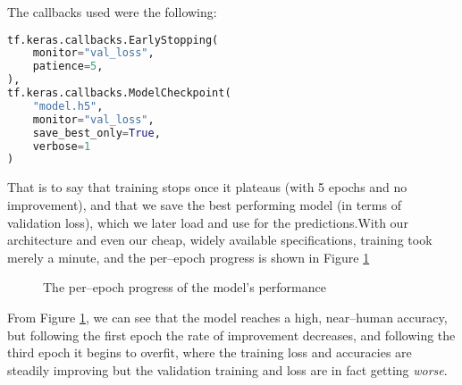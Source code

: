 \documentclass[conference]{IEEEtran}
\begin{document}
The callbacks used were the following:
\begin{lstlisting}[language=Python]
tf.keras.callbacks.EarlyStopping( 
    monitor="val_loss",
    patience=5,
),
tf.keras.callbacks.ModelCheckpoint( 
    "model.h5",
    monitor="val_loss",
    save_best_only=True,
    verbose=1
)
\end{lstlisting}
That is to say that training stops once it plateaus (with 5 epochs and no improvement), and that we save the best performing model (in terms of validation loss), which we later load and use for the predictions.\@ With our architecture and even our cheap, widely available specifications, training took merely a minute, and the per--epoch progress is shown in Figure \ref{fig:perepoch}
\begin{figure}[!h]
    \centering
    \scriptsize
    \caption{The per--epoch progress of the model's performance }\label{fig:perepoch}
\end{figure}
\par From Figure \ref{fig:perepoch}, we can see that the model reaches a high, near--human accuracy, but following the first epoch the rate of improvement decreases, and following the third epoch it begins to overfit, where the training loss and accuracies are steadily improving but the validation training and loss are in fact getting \textit{worse}.
\end{document}

